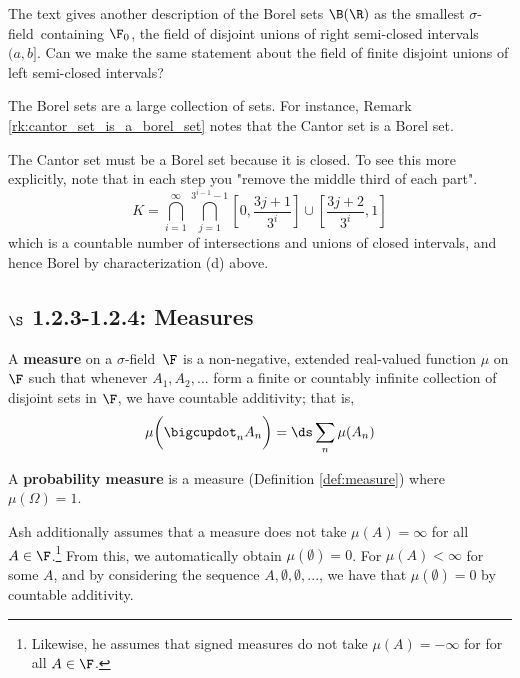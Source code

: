 \documentclass{article} %
\renewcommand{\sf}{$\sigma$-field}
\begin{document}
\fi 




\begin{question}
The text gives another description of the Borel sets $\B(\R)$ as the smallest \sf\ containing $\F_0$, the field of disjoint unions of right semi-closed intervals $(a,b]$.  Can we make the same statement about the field of finite disjoint unions of left semi-closed intervals?
\end{question}

The Borel sets are a large collection of sets.  For instance, Remark \ref{rk:cantor_set_is_a_borel_set} notes that the Cantor set is a Borel set. 

\begin{remark}{}
The Cantor set must be a Borel set because it is closed.  To see this more explicitly, note that in each step you "remove the middle third of each part".  
\[K = \bigcap_{i=1}^\infty\bigcap_{j=1}^{3^{i-1}-1}\left[0,\frac{3j+1}{3^i}\right]\cup \left[\frac{3j+2}{3^i}, 1\right] \]
which is a countable number of intersections and unions of closed intervals, and hence Borel by characterization (d) above. 
\label{rk:cantor_set_is_a_borel_set}
\end{remark}

\subsection{$\S$ 1.2.3-1.2.4: Measures}




\begin{definition}
A \textbf{measure} on a \sf\ $\F$ is a non-negative, extended real-valued function $\mu$ on $\F$ such that whenever $A_1, A_2, ...$ form a finite or countably infinite collection of disjoint sets in $\F$, we have countable additivity; that is,
\[ \mu \bigg( \bigcupdot_n A_n \bigg) = \ds\sum_n \mu(A_n) \]
\label{def:measure}	
\end{definition}

\begin{definition}
A \textbf{probability measure} is a measure (Definition \ref{def:measure}) where $\mu(\Omega)=1$.
\label{def:prob_measure}		
\end{definition}

\begin{remark}
Ash additionally assumes that a measure does not take $\mu(A) = \infty$ for all $A \in \F$.\footnote{Likewise, he assumes that signed measures do not take $\mu(A) = -\infty$ for  for all $A \in \F$.}  From this, we automatically obtain $\mu(\emptyset)=0$. For $\mu(A) < \infty$ for some $A$, and by considering the sequence $A, \emptyset, \emptyset, ...$, we have that $\mu(\emptyset)=0$ by countable additivity.   	
\end{remark}
\end{document}
